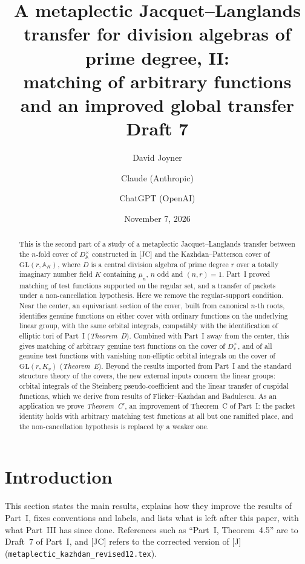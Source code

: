 \documentclass[12pt]{article}
\title{A metaplectic Jacquet--Langlands transfer for division algebras of prime degree, II:\\ matching of arbitrary functions and an improved global transfer\\[0.4em]\normalsize Draft 7}
\author{David Joyner \and Claude (Anthropic) \and ChatGPT (OpenAI)}
\date{November 7, 2026}
\newcommand{\A}{\mathbb{A}}
\newcommand{\GL}{\mathrm{GL}}
\theoremstyle{plain}
\theoremstyle{definition}
\begin{document}
\maketitle

\begin{abstract}
This is the second part of a study of a metaplectic Jacquet--Langlands transfer between the $n$-fold cover of $D^\times_{\A}$ constructed in [JC] and the Kazhdan--Patterson cover of $\GL(r,\A_K)$, where $D$ is a central division algebra of prime degree $r$ over a totally imaginary number field $K$ containing $\mu_n$, $n$ odd and $(n,r)=1$. Part~I proved matching of test functions supported on the regular set, and a transfer of packets under a non-cancellation hypothesis. Here we remove the regular-support condition. Near the center, an equivariant section of the cover, built from canonical $n$-th roots, identifies genuine functions on either cover with ordinary functions on the underlying linear group, with the same orbital integrals, compatibly with the identification of elliptic tori of Part~I (\emph{Theorem~D}). Combined with Part~I away from the center, this gives matching of arbitrary genuine test functions on the cover of $D_v^\times$, and of all genuine test functions with vanishing non-elliptic orbital integrals on the cover of $\GL(r,K_v)$ (\emph{Theorem~E}). Beyond the results imported from Part~I and the standard structure theory of the covers, the new external inputs concern the linear groups: orbital integrals of the Steinberg pseudo-coefficient and the linear transfer of cuspidal functions, which we derive from results of Flicker--Kazhdan and Badulescu. As an application we prove \emph{Theorem~C$'$}, an improvement of Theorem~C of Part~I: the packet identity holds with arbitrary matching test functions at all but one ramified place, and the non-cancellation hypothesis is replaced by a weaker one.
\end{abstract}

\tableofcontents

\section{Introduction}\label{sec:intro}
This section states the main results, explains how they improve the results of Part~I, fixes conventions and labels, and lists what is left after this paper, with what Part~III has since done. References such as ``Part~I, Theorem~4.5'' are to Draft~7 of Part~I, and [JC] refers to the corrected version of [J] (\texttt{metaplectic\_kazhdan\_revised12.tex}).
\end{document}
